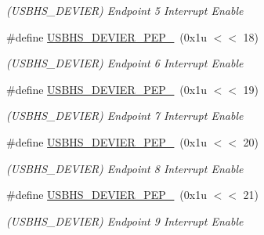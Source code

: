 \begin{DoxyCompactItemize}
\begin{DoxyCompactList}\small\item\em (U\+S\+B\+H\+S\+\_\+\+D\+E\+V\+I\+ER) Endpoint 5 Interrupt Enable \end{DoxyCompactList}\item 
\mbox{\label{group__SAMV71__USBHS_gab1e6852eb17483b0a88793b4224e9bfa}} 
\#define \mbox{\hyperlink{group__SAMV71__USBHS_gab1e6852eb17483b0a88793b4224e9bfa}{U\+S\+B\+H\+S\+\_\+\+D\+E\+V\+I\+E\+R\+\_\+\+P\+E\+P\+\_}}~(0x1u $<$$<$ 18)
\begin{DoxyCompactList}\small\item\em (U\+S\+B\+H\+S\+\_\+\+D\+E\+V\+I\+ER) Endpoint 6 Interrupt Enable \end{DoxyCompactList}\item 
\mbox{\label{group__SAMV71__USBHS_ga69639d539ccbec8775cc4fd4a97c3c5f}} 
\#define \mbox{\hyperlink{group__SAMV71__USBHS_ga69639d539ccbec8775cc4fd4a97c3c5f}{U\+S\+B\+H\+S\+\_\+\+D\+E\+V\+I\+E\+R\+\_\+\+P\+E\+P\+\_}}~(0x1u $<$$<$ 19)
\begin{DoxyCompactList}\small\item\em (U\+S\+B\+H\+S\+\_\+\+D\+E\+V\+I\+ER) Endpoint 7 Interrupt Enable \end{DoxyCompactList}\item 
\mbox{\label{group__SAMV71__USBHS_ga31087c3b3d3c78d034e7a277f13e85da}} 
\#define \mbox{\hyperlink{group__SAMV71__USBHS_ga31087c3b3d3c78d034e7a277f13e85da}{U\+S\+B\+H\+S\+\_\+\+D\+E\+V\+I\+E\+R\+\_\+\+P\+E\+P\+\_}}~(0x1u $<$$<$ 20)
\begin{DoxyCompactList}\small\item\em (U\+S\+B\+H\+S\+\_\+\+D\+E\+V\+I\+ER) Endpoint 8 Interrupt Enable \end{DoxyCompactList}\item 
\mbox{\label{group__SAMV71__USBHS_ga35c6c650e417e85c0e102c2eb98c1d21}} 
\#define \mbox{\hyperlink{group__SAMV71__USBHS_ga35c6c650e417e85c0e102c2eb98c1d21}{U\+S\+B\+H\+S\+\_\+\+D\+E\+V\+I\+E\+R\+\_\+\+P\+E\+P\+\_}}~(0x1u $<$$<$ 21)
\begin{DoxyCompactList}\small\item\em (U\+S\+B\+H\+S\+\_\+\+D\+E\+V\+I\+ER) Endpoint 9 Interrupt Enable \end{DoxyCompactList}\item 

\end{DoxyCompactItemize}

